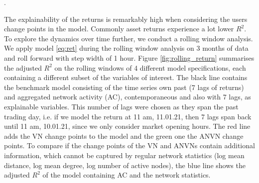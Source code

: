 . %

%

%


%

%

%


%


The explainability of the returns is remarkably high when considering the users change points in the model. Commonly asset returns experience a lot lower $R^2$. To explore the dynamics over time further, we conduct a rolling window analysis. We apply model \eqref{eq:ret} %
during the rolling window analysis on 3 months of data and roll forward with step width of 1 hour. Figure \ref{fig:rolling_return} %
summarises the adjusted $R^2$ on the rolling windows of 4 different model specifications, each containing a different subset of the variables of interest. The black line contains the benchmark model consisting of the time series own past (7 lags of returns) %
and aggregated network activity (AC), contemporaneous and also with 7 lags, as explainable variables. This number of lags were chosen as they span the past trading day, i.e. if we model the return at 11 am, 11.01.21, then 7 lags span back until 11 am, 10.01.21, since we only consider market opening hours. The red line adds the VN change points to the model and the green one the ANVN change points. To compare if the change points of the VN and ANVNs contain additional information, which cannot be captured by regular network statistics (log mean distance, log mean degree, log number of active nodes), the blue line shows the adjusted $R^2$ of the model containing AC and the network statistics. 


